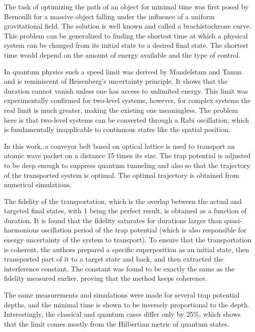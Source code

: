 \documentclass[a4paper, 12pt]{article}
\begin{document}
The task of optimizing the path of an object for minimal time was first 
posed by Bernoulli for a massive object falling under the influence of 
a uniform gravitational field. The solution is well known and called 
a brachistochrone curve. This problem can be generalized to finding the 
shortest time at which a physical system can be changed from its initial 
state to a desired final state. The shortest time would depend on the 
amount of energy available and the type of control.

In quantum physics such a speed limit was derived by Mandelstam and Tamm 
and is reminiscent of Heisenberg's uncertainty principle. It shows that 
the duration cannot vanish unless one has access to unlimited energy. 
This limit was experimentally confirmed for two-level systems, however, 
for complex systems the real limit is much greater, making the existing 
one meaningless. The problem here is that two-level systems can be 
converted through a Rabi oscillation, which is fundamentally 
inapplicable to continuous states like the spatial position.

In this work, a conveyor belt based on optical lattice is used to 
transport an atomic wave packet on a distance 15 times its size. The 
trap potential is adjusted to be deep enough to suppress quantum 
tunneling and also so that the trajectory of the transported system is 
optimal. The optimal trajectory is obtained from numerical simulations.

The fidelity of the transportation, which is the overlap between the 
actual and targeted final states, with 1 being the perfect result, is 
obtained as a function of duration. It is found that the fidelity 
saturates for durations larger than quasi-harmonious oscillation period 
of the trap potential (which is also responsible for energy uncertainty 
of the system to transport). To ensure that the transportation is 
coherent, the authors prepared a specific superposition as an initial 
state, then transported part of it to a target state and back, and then 
extracted the interference constant. The constant was found to be 
exactly the same as the fidelity measured earlier, proving that the 
method keeps coherence.

The same measurements and simulations were made for several trap 
potential depths, and the minimal time is shown to be inversely 
proportional to the depth. Interestingly, the classical and quantum 
cases differ only by 25\%, which shows that the limit comes mostly from 
the Hilbertian metric of quantum states.
\end{document}
